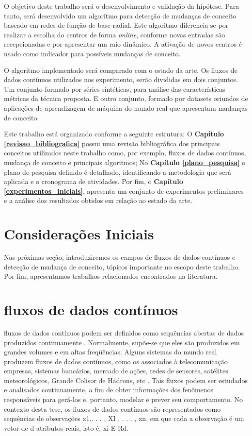 \documentclass[qual, classic, a4paper]{ufbathesis}
\begin{document}
O objetivo deste trabalho será o desenvolvimento e validação da hipótese.
Para tanto, será desenvolvido um algoritmo para detecção de mudanças de conceito baseado em redes de função de base radial. Este algoritmo diferencia-se por realizar a escolha do centros de forma \textit{online}, conforme novas entradas são recepcionadas e por apresentar um raio dinâmico. 
A ativação de novos centros é usado como indicador para possíveis mudanças de conceito.

O algoritmo implementado será comparado com o estado da arte. Os fluxos de dados contínuos utilizados nos experimento, serão divididas em dois conjuntos. Um conjunto formado por séries sintéticas, para análise das características métricas da técnica proposta. E outro conjunto, formado por datasets oriundos de aplicações de aprendizagem de máquina do mundo real que apresentam mudanças de conceito.

Este trabalho está organizado conforme a seguinte estrutura: O \textbf{Capítulo \ref{revisao_bibliografica}} possui uma revisão bibliográfica dos principais conceitos utilizados neste trabalho como, por exemplo, fluxos de dados contínuos, mudança de conceito e principais algoritmos; No \textbf{Capítulo \ref{plano_pesquisa}} o plano de pesquisa definido é detalhado, identificando a metodologia que será aplicada e o cronograma de atividades. Por fim, o \textbf{Capítulo \ref{experimentos_iniciais}}, apresenta um conjunto de experimentos preliminares e a análise dos resultados obtidos em relação ao estado da arte.

 \label{revisao_bibliografica}
\section{Considerações Iniciais}

Nas próximas seção, introduziremos os campos de fluxos de dados contínuos e detecção de mudança de conceito, tópicos importante no escopo deste trabalho. Por fim, apresentamos trabalhos relacionados encontrados na literatura.

\section{fluxos de dados contínuos}

fluxos de dados contínuos podem ser definidos como sequências abertas de dados produzidos continuamente \cite{Pavlidis:2011:9AC:1860144.1860487}.
Normalmente, supõe-se que eles são produzidos em grandes volumes e em altas freqüências. Alguns sistemas do mundo real produzem fluxos de dados contínuos, como os associados à telecomunicação empresas, sistemas bancários, mercado de ações, redes de sensores, satélites meteorológicos, Grande Colisor de Hádrons, etc \cite{Guha:2003:CDS:776752.776777}.
Tais fluxos podem ser estudados e analisados continuamente, a fim de obter informações dos fenômenos responsáveis para gerá-los e, portanto, modelar e prever seu comportamento. No contexto desta tese, os fluxos de dados contínuos são representados como sequências de observações x1,. . . , XI , . . . , xn, em que cada a observação é um vetor de d atributos reais, isto é, xi E Rd.
\end{document}

